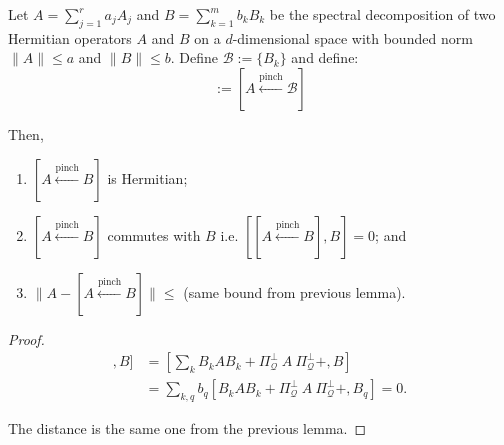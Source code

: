 \begin{lemma}
Let $A = \sum\limits_{j = 1}^r a_j A_j$ and $B = \sum\limits_{k = 1}^m b_k B_k$ be the spectral decomposition of two Hermitian operators $A$ and $B$ on a $d$-dimensional space with bounded norm $\|A\| \leq a$ and $\|B\| \leq b$. Define $\mathcal{B} := \{B_k\}$ and define:
\begin{equation}
    [A \overset{\text{pinch}}{\gets} B] :=  [A \overset{\text{pinch}}{\gets} \mathcal{B}]
\end{equation}

\noindent Then,
\begin{enumerate}
    \item $[A \overset{\text{pinch}}{\gets} B]$ is Hermitian;
    \item $[A \overset{\text{pinch}}{\gets} B]$ commutes with $B$ i.e. $[[A \overset{\text{pinch}}{\gets} B], B] = 0$; and
    \item $\| A - [A \overset{\text{pinch}}{\gets} B] \| \leq$ (same bound from previous lemma).
\end{enumerate}
\end{lemma}

\begin{proof}

\begin{align*}
     [[A \overset{\text{pinch}}{\gets} B], B] &= \left[\sum\limits_{k} B_k A B_k + \Pi_{\mathcal{Q}}^\bot \ A\ \Pi_{\mathcal{Q}}^\bot + , B\right]\\
     &= \sum\limits_{k, q} b_q\left[B_k A B_k + \Pi_{\mathcal{Q}}^\bot \ A\ \Pi_{\mathcal{Q}}^\bot + , B_q\right] = 0.
\end{align*}

The distance is the same one from the previous lemma.

\end{proof}

